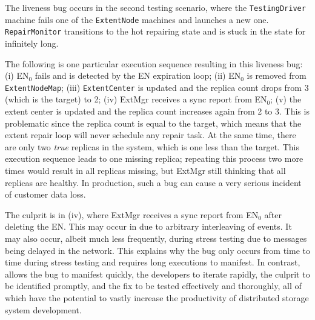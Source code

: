 The liveness bug occurs in the second testing scenario, where the \texttt{TestingDriver} machine fails one of the \texttt{ExtentNode} machines and launches a new one. \texttt{RepairMonitor} transitions to the hot repairing state and is stuck in the state for infinitely long.

The following is one particular execution sequence resulting in this liveness bug: (i) EN$_0$ fails and is detected by the EN expiration loop; (ii) EN$_0$ is removed from \texttt{ExtentNodeMap}; (iii) \texttt{ExtentCenter} is updated and the replica count drops from 3 (which is the target) to 2; (iv) ExtMgr receives a sync report from EN$_0$; (v) the extent center is updated and the replica count increases again from 2 to 3. This is problematic since the replica count is equal to the target, which means that the extent repair loop will never schedule any repair task. At the same time, there are only two \emph{true} replicas in the system, which is one less than the target. This execution sequence leads to one missing replica; repeating this process two more times would result in all replicas missing, but ExtMgr still thinking that all replicas are healthy. In production, such a bug can cause a very serious incident of customer data loss.

The culprit is in (iv), where ExtMgr receives a sync report from EN$_0$ after deleting the EN. This may occur in \psharp due to arbitrary interleaving of events. It may also occur, albeit much less frequently, during stress testing due to messages being delayed in the network. This explains why the bug only occurs from time to time during stress testing and requires long executions to manifest. In contrast, \psharp allows the bug to manifest quickly, the developers to iterate rapidly, the culprit to be identified promptly, and the fix to be tested effectively and thoroughly, all of which have the potential to vastly increase the productivity of distributed storage system development.

